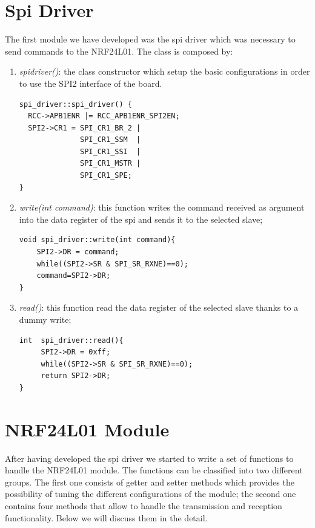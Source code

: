 \documentclass[11pt,a4paper,oneside]{article}
\begin{document}
\section{Spi Driver}
The first module we have developed was the spi driver which was necessary to  send commands to the NRF24L01.
The class is composed by:
\begin{enumerate}
\item {\itshape spi\textunderscore driver()}: the class constructor which setup the basic configurations in order to use the SPI2 interface of the board.
\lstset{numbers=left,numberstyle=\tiny}
\begin{lstlisting}[frame=single]
spi_driver::spi_driver() {
  RCC->APB1ENR |= RCC_APB1ENR_SPI2EN; 
  SPI2->CR1 = SPI_CR1_BR_2 |                       
              SPI_CR1_SSM  | 
              SPI_CR1_SSI  |               
              SPI_CR1_MSTR |                                  
              SPI_CR1_SPE;
}           
\end{lstlisting}
\item {\itshape write(int command)}: this function writes the command received as argument into the data register of the spi and sends it to the selected slave;
\lstset{numbers=left,numberstyle=\tiny}
\begin{lstlisting}[frame=single]
void spi_driver::write(int command){
    SPI2->DR = command;
    while((SPI2->SR & SPI_SR_RXNE)==0); 
    command=SPI2->DR;
}
\end{lstlisting}
\item {\itshape read()}: this function read the data register of the selected slave thanks to a dummy write; 
\lstset{numbers=left,numberstyle=\tiny}
\begin{lstlisting}[frame=single]
int  spi_driver::read(){
     SPI2->DR = 0xff;             
     while((SPI2->SR & SPI_SR_RXNE)==0);
     return SPI2->DR;  
}
\end{lstlisting}
\end{enumerate}
\newpage
\section{NRF24L01 Module}
After having developed the spi driver we started to write a set of functions to handle the NRF24L01 module.
The functions can be classified into two different groups. 
The first one consists of getter and setter methods which provides the possibility of tuning the different configurations of the module; the second one contains four methods that allow to handle the transmission and reception functionality. Below we will discuss them in the detail.
\end{document}
